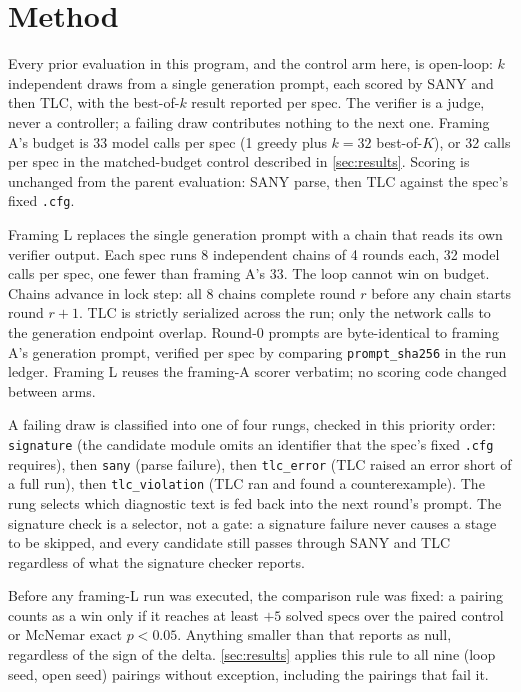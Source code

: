 \section{Method}\label{sec:method}

 Every prior evaluation in this program,
and the control arm here, is open-loop: $k$ independent draws from a single
generation prompt, each scored by SANY and then TLC, with the best-of-$k$
result reported per spec. The verifier is a judge, never a controller; a
failing draw contributes nothing to the next one. Framing A's budget is 33
model calls per spec (1 greedy plus $k{=}32$ best-of-$K$), or 32 calls per
spec in the matched-budget control described in \autoref{sec:results}.
Scoring is unchanged from the parent evaluation: SANY parse, then TLC against
the spec's fixed \texttt{.cfg}.

 Framing L replaces the single
generation prompt with a chain that reads its own verifier output. Each spec
runs 8 independent chains of 4 rounds each, 32 model calls per spec, one
fewer than framing A's 33. The loop cannot win on budget. Chains advance in
lock step: all 8 chains complete round $r$ before any chain starts round
$r{+}1$. TLC is strictly serialized across the run; only the network calls to
the generation endpoint overlap. Round-0 prompts are byte-identical to
framing A's generation prompt, verified per spec by comparing
\texttt{prompt\_sha256} in the run ledger. Framing L reuses the framing-A
scorer verbatim; no scoring code changed between arms.

 A failing draw is classified into one of four rungs,
checked in this priority order: \texttt{signature} (the candidate module
omits an identifier that the spec's fixed \texttt{.cfg} requires), then
\texttt{sany} (parse failure), then \texttt{tlc\_error} (TLC raised an error
short of a full run), then \texttt{tlc\_violation} (TLC ran and found a
counterexample). The rung selects which diagnostic text is fed back into the
next round's prompt. The signature check is a selector, not a gate: a
signature failure never causes a stage to be skipped, and every candidate
still passes through SANY and TLC regardless of what the signature checker
reports.

 Before any framing-L run was executed,
the comparison rule was fixed: a pairing counts as a win only if it reaches
at least $+5$ solved specs over the paired control or McNemar exact
$p < 0.05$. Anything smaller than that reports as null, regardless of the
sign of the delta. \autoref{sec:results} applies this rule to all nine
(loop seed, open seed) pairings without exception, including the pairings
that fail it.

